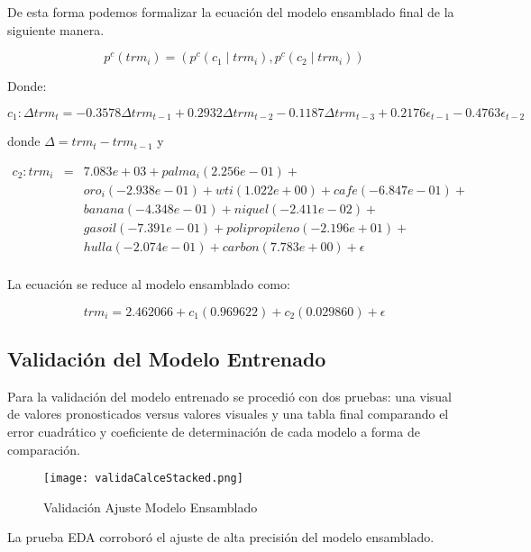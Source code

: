 De esta forma podemos formalizar la ecuación del modelo ensamblado final de la siguiente manera.

\begin{equation}
    p^{c}(trm_i) = (p^{c}(c_{1} \mid trm_i),p^{c}(c_{2} \mid trm_i))
\end{equation}

Donde:

\begin{equation}
    c_{1} : \Delta trm_t = -0.3578 \Delta trm_{t-1} + 0.2932 \Delta trm_{t-2} - 0.1187 \Delta trm_{t-3} + 0.2176 \epsilon_{t-1} - 0.4763 \epsilon_{t-2}
\end{equation}

donde $\Delta = trm_{t} - trm_{t-1}$ y

\begin{eqnarray*}
    c_2 : trm_i & = & 7.083e+03 + palma_i(2.256e-01) + \\
& & oro_i(-2.938e-01) + wti(1.022e+00) + cafe(-6.847e-01) +  \\
& & banana(-4.348e-01) + niquel(-2.411e-02) + \\
& & gasoil(-7.391e-01) + polipropileno(-2.196e+01) + \\
& & hulla(-2.074e-01) + carbon(7.783e+00) + \epsilon \\
\end{eqnarray*}

La ecuación se reduce al modelo ensamblado como:

\begin{equation}
    trm_i = 2.462066 + c_1(0.969622) + c_2(0.029860) + \epsilon
\end{equation}

\subsection{Validación del Modelo Entrenado}
Para la validación del modelo entrenado se procedió con dos pruebas: una visual de valores pronosticados versus valores visuales y una tabla final comparando el error cuadrático y coeficiente de determinación de cada modelo a forma de comparación.

\begin{figure}[h!]
    \centering
    \texttt{[image: validaCalceStacked.png]}
    \caption{Validación Ajuste Modelo Ensamblado}
\end{figure}

La prueba EDA corroboró el ajuste de alta precisión del modelo ensamblado.

